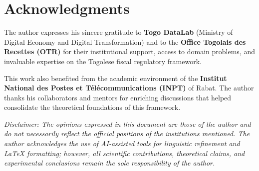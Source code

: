 \documentclass[letterpaper]{article}
\begin{document}
\section*{Acknowledgments}

The author expresses his sincere gratitude to \textbf{Togo DataLab}
(Ministry of Digital Economy and Digital Transformation) and to the
\textbf{Office Togolais des Recettes (OTR)} for their institutional
support, access to domain problems, and invaluable expertise on the
Togolese fiscal regulatory framework.

This work also benefited from the academic environment of the
\textbf{Institut National des Postes et T\'el\'ecommunications (INPT)}
of Rabat. The author thanks his collaborators and mentors for enriching
discussions that helped consolidate the theoretical foundations of this
framework.

\smallskip
\noindent\textit{Disclaimer: The opinions expressed in this document
are those of the author and do not necessarily reflect the official
positions of the institutions mentioned. The author acknowledges the
use of AI-assisted tools for linguistic refinement and \LaTeX{}
formatting; however, all scientific contributions, theoretical claims,
and experimental conclusions remain the sole responsibility of the
author.}
\end{document}
